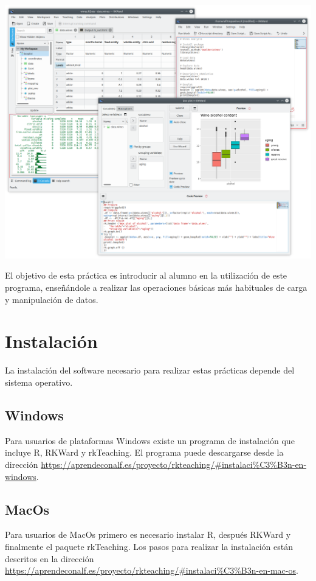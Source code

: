 \begin{center}
  \includegraphics[width=\textwidth]{capitulos/introduccion/img/rkward}
\end{center}

El objetivo de esta práctica es introducir al alumno en la utilización de este programa, enseñándole a realizar las operaciones básicas más habituales de carga y manipulación de datos.

\section{Instalación}
La instalación del software necesario para realizar estas prácticas depende del sistema operativo. 

\subsection{Windows}
Para usuarios de plataformas Windows existe un programa de instalación que incluye R, RKWard y rkTeaching. El programa puede descargarse desde la dirección \url{https://aprendeconalf.es/proyecto/rkteaching/#instalaci%C3%B3n-en-windows}.

\subsection{MacOs}
Para usuarios de MacOs primero es necesario instalar R, después RKWard y finalmente el paquete rkTeaching. Los pasos para realizar la instalación están descritos en la dirección \url{https://aprendeconalf.es/proyecto/rkteaching/#instalaci%C3%B3n-en-mac-os}.

